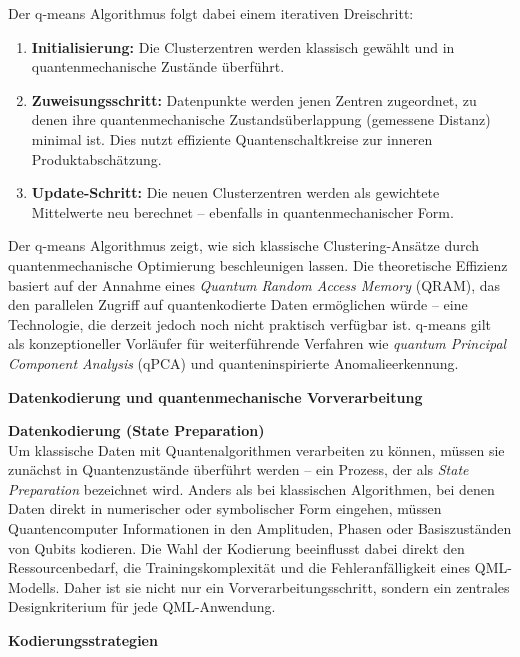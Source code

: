 \noindent  
Der q-means Algorithmus folgt dabei einem iterativen Dreischritt:  
\begin{enumerate}
  \item \textbf{Initialisierung:} Die Clusterzentren werden klassisch gewählt und in quantenmechanische Zustände überführt.
  \item \textbf{Zuweisungsschritt:} Datenpunkte werden jenen Zentren zugeordnet, zu denen ihre quantenmechanische Zustandsüberlappung (gemessene Distanz) minimal ist. Dies nutzt effiziente Quantenschaltkreise zur inneren Produktabschätzung.
  \item \textbf{Update-Schritt:} Die neuen Clusterzentren werden als gewichtete Mittelwerte neu berechnet – ebenfalls in quantenmechanischer Form.
\end{enumerate}  

\noindent  
Der q-means Algorithmus zeigt, wie sich klassische Clustering-Ansätze durch quantenmechanische Optimierung beschleunigen lassen. Die theoretische Effizienz basiert auf der Annahme eines \textit{Quantum Random Access Memory} (QRAM), das den parallelen Zugriff auf quantenkodierte Daten ermöglichen würde – eine Technologie, die derzeit jedoch noch nicht praktisch verfügbar ist. q-means gilt als konzeptioneller Vorläufer für weiterführende Verfahren wie \textit{quantum Principal Component Analysis} (qPCA) und quanteninspirierte Anomalieerkennung. \cite{kerenidis_q-means_2019} 

\vspace{0.5cm}
\noindent\textbf{Datenkodierung und quantenmechanische Vorverarbeitung}  

\noindent
\textbf{Datenkodierung (State Preparation)}\\
Um klassische Daten mit Quantenalgorithmen verarbeiten zu können, müssen sie zunächst in Quantenzustände überführt werden – ein Prozess, der als \textit{State Preparation} bezeichnet wird. Anders als bei klassischen Algorithmen, bei denen Daten direkt in numerischer oder symbolischer Form eingehen, müssen Quantencomputer Informationen in den Amplituden, Phasen oder Basiszuständen von Qubits kodieren. Die Wahl der Kodierung beeinflusst dabei direkt den Ressourcenbedarf, die Trainingskomplexität und die Fehleranfälligkeit eines QML-Modells. Daher ist sie nicht nur ein Vorverarbeitungsschritt, sondern ein zentrales Designkriterium für jede QML-Anwendung. \cite{schuld_introduction_2015}

\vspace{0.3cm}
\noindent
\textbf{Kodierungsstrategien}  

